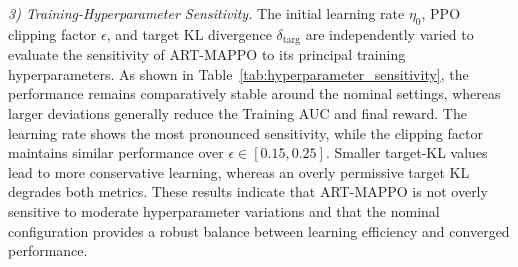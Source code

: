 \documentclass[lettersize,journal]{IEEEtran}
\begin{document}
\emph{3) Training-Hyperparameter Sensitivity.}
The initial learning rate $\eta_0$, PPO clipping factor $\epsilon$, and
target KL divergence $\delta_{\mathrm{targ}}$ are independently varied to
evaluate the sensitivity of ART-MAPPO to its principal training
hyperparameters. As shown in Table~\ref{tab:hyperparameter_sensitivity}, the
performance remains comparatively stable around the nominal settings, whereas
larger deviations generally reduce the Training AUC and final reward. The
learning rate shows the most pronounced sensitivity, while the clipping factor
maintains similar performance over $\epsilon\in[0.15,0.25]$. Smaller target-KL
values lead to more conservative learning, whereas an overly permissive target
KL degrades both metrics. These results indicate that ART-MAPPO is not overly
sensitive to moderate hyperparameter variations and that the nominal
configuration provides a robust balance between learning efficiency and
converged performance.
\end{document}
